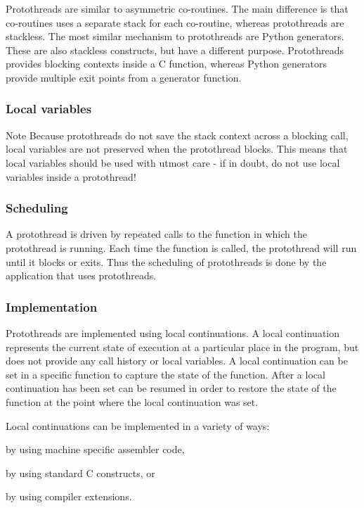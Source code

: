 Protothreads are similar to asymmetric co-\/routines. The main difference is that co-\/routines uses a separate stack for each co-\/routine, whereas protothreads are stackless. The most similar mechanism to protothreads are Python generators. These are also stackless constructs, but have a different purpose. Protothreads provides blocking contexts inside a C function, whereas Python generators provide multiple exit points from a generator function.\hypertarget{a00066_pt-autovars}{}\subsubsection{Local variables}\label{a00066_pt-autovars}
\begin{DoxyNote}{Note}
Because protothreads do not save the stack context across a blocking call, local variables are not preserved when the protothread blocks. This means that local variables should be used with utmost care -\/ if in doubt, do not use local variables inside a protothread!
\end{DoxyNote}
\hypertarget{a00066_pt-scheduling}{}\subsubsection{Scheduling}\label{a00066_pt-scheduling}
A protothread is driven by repeated calls to the function in which the protothread is running. Each time the function is called, the protothread will run until it blocks or exits. Thus the scheduling of protothreads is done by the application that uses protothreads.\hypertarget{a00066_pt-impl}{}\subsubsection{Implementation}\label{a00066_pt-impl}
Protothreads are implemented using local continuations. A local continuation represents the current state of execution at a particular place in the program, but does not provide any call history or local variables. A local continuation can be set in a specific function to capture the state of the function. After a local continuation has been set can be resumed in order to restore the state of the function at the point where the local continuation was set.

Local continuations can be implemented in a variety of ways\+:


\begin{DoxyEnumerate}
\item by using machine specific assembler code,
\item by using standard C constructs, or
\item by using compiler extensions.
\end{DoxyEnumerate}

